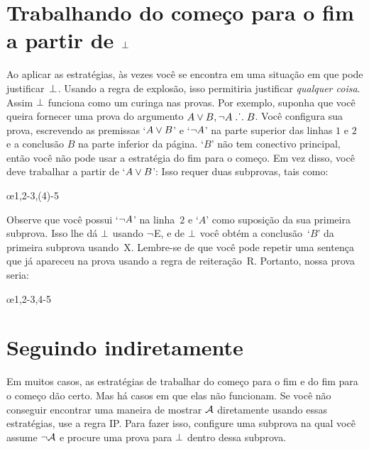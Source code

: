 
\section{Trabalhando do come\c co para o fim a partir de $\bot$}\label{sec:backred}

Ao aplicar as estrat\'egias, \`as vezes voc\^e se encontra em uma situa\c c\~ao em que pode justificar~$\bot$. Usando a regra de explos\~ao, isso permitiria justificar \emph{qualquer coisa}. Assim $\bot$ funciona como um curinga nas provas. Por exemplo, suponha que voc\^e queira fornecer uma prova do argumento $A \vee B, \neg A \mathrel{\ldotp\dot{}\,\ldotp} B$. Voc\^e configura sua prova, escrevendo as premissas `$A \vee B$' e `$\neg A$' na parte superior das linhas $1$ e $2$ e a conclus\~ao $B$ na parte inferior da p\'agina. `$B$' n\~ao tem conectivo principal, ent\~ao voc\^e n\~ao pode usar a estrat\'egia do fim para o come\c co. Em vez disso, voc\^e deve trabalhar a partir de `$A \vee B$': Isso requer duas subprovas,  tais como:


\begin{fitchproof}
	\open
	\ellipsesline 
	\close 
	\open
	\ellipsesline
	\close
	\oe{1,2-3,(4)-5} 
\end{fitchproof} 
Observe que voc\^e possui   `$\neg A$' na linha~$2$ e `$A$' como suposi\c c\~ao da sua primeira subprova. Isso lhe d\'a  $\bot$  usando $\neg$E, e de $\bot$ voc\^e obt\'em a conclus\~ao~`$B$' da primeira subprova usando~X. Lembre-se de que voc\^e pode repetir uma senten\c ca que j\'a apareceu na prova  usando a regra de reitera\c c\~ao~R. Portanto, nossa prova seria:
\begin{fitchproof}
	\open
	\close 
	\open
	\close
	\oe{1,2-3,4-5} 
\end{fitchproof} 
\section{Seguindo indiretamente}

Em muitos casos, as estrat\'egias de trabalhar do come\c co para o fim  e do fim para o come\c co d\~ao certo. Mas h\'a casos em que elas n\~ao funcionam. Se voc\^e n\~ao conseguir encontrar uma maneira de mostrar $\mathcal{A}$ diretamente usando essas estrat\'egias,  use a regra IP. Para fazer isso, configure uma subprova na qual voc\^e assume  $\neg\mathcal{A}$  e procure uma prova para $\bot$ dentro dessa subprova.

